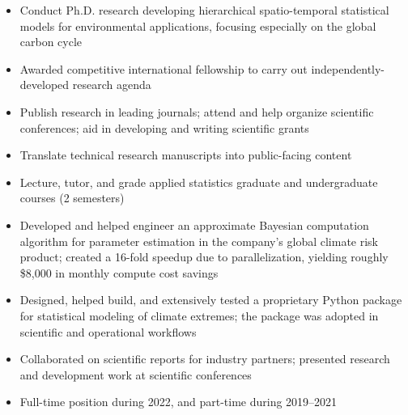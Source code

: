 \documentclass[10pt,letterpaper,ragged2e,withhyper]{altacv}
\begin{document}
\vspace{0.1em}
\begin{paracol}{2}



  \begin{itemize}
    \item Conduct Ph.D. research developing hierarchical spatio-temporal statistical models for environmental applications, focusing especially on the global carbon cycle
    \item Awarded competitive international fellowship to carry out independently-developed research agenda
    \item Publish research in leading journals; attend and help organize scientific conferences; aid in developing and writing scientific grants
    \item Translate technical research manuscripts into public-facing content
    \item Lecture, tutor, and grade applied statistics graduate and undergraduate courses (2 semesters)
  \end{itemize}

  \vspace{-0.75em}
  \divider

  \begin{itemize}
    \item Developed and helped engineer an approximate Bayesian computation algorithm for parameter estimation in the company's global climate risk product; created a 16-fold speedup due to parallelization, yielding roughly \$8,000 in monthly compute cost savings
    \item Designed, helped build, and extensively tested a proprietary Python package for statistical modeling of climate extremes; the package was adopted in scientific and operational workflows
    \item Collaborated on scientific reports for industry partners; presented research and development work at scientific conferences
    \item Full-time position during 2022, and part-time during 2019--2021
  \end{itemize}


\end{paracol}
\end{document}

